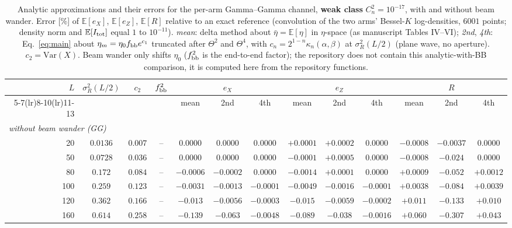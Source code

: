 \begin{table}[htbp]
\centering\scriptsize
\caption{Analytic approximations and their errors for the per-arm Gamma--Gamma channel, \textbf{weak class} $C_n^2=10^{-17}$, with and without beam wander. Error [\%] of $\mathbb E[e_X]$, $\mathbb E[e_Z]$, $\mathbb E[R]$ relative to an exact reference (convolution of the two arms' Bessel-$K$ log-densities, $6001$ points; density norm and $\mathbb E[I_{\rm tot}]$ equal $1$ to $10^{-11}$). \emph{mean}: delta method about $\bar\eta=\mathbb E[\eta]$ in $\eta$-space (as manuscript Tables IV--VI); \emph{2nd}, \emph{4th}: Eq.~\eqref{eq:main} about $\eta_m=\eta_0f_{\rm bb}e^{c_1}$ truncated after $\Theta^2$ and $\Theta^4$, with $c_n=2^{1-n}\kappa_n(\alpha,\beta)$ at $\sigma_R^2(L/2)$ (plane wave, no aperture). $c_2=\mathrm{Var}(X)$. Beam wander only shifts $\eta_0$ ($f_{\rm bb}^2$ is the end-to-end factor); the repository does not contain this analytic-with-BB comparison, it is computed here from the repository functions.}
\label{tab:perarm-weak}
\begin{tabular}{rcccccccccccc}
\toprule
$L$ & $\sigma_R^2(L/2)$ & $c_2$ & $f_{\rm bb}^2$ & \multicolumn{3}{c}{$e_X$} & \multicolumn{3}{c}{$e_Z$} & \multicolumn{3}{c}{$R$}\\
\cmidrule(lr){5-7}\cmidrule(lr){8-10}\cmidrule(lr){11-13}
 & & & & mean & 2nd & 4th & mean & 2nd & 4th & mean & 2nd & 4th\\
\midrule
\multicolumn{13}{l}{\emph{without beam wander (GG)}} \\
20 & $0.0136$ & $0.007$ & -- & $0.0000$ & $0.0000$ & $0.0000$ & $+0.0001$ & $+0.0002$ & $0.0000$ & $-0.0008$ & $-0.0037$ & $0.0000$ \\
50 & $0.0728$ & $0.036$ & -- & $0.0000$ & $0.0000$ & $0.0000$ & $-0.0001$ & $+0.0005$ & $0.0000$ & $-0.0008$ & $-0.024$ & $0.0000$ \\
80 & $0.172$ & $0.084$ & -- & $-0.0006$ & $-0.0002$ & $0.0000$ & $-0.0014$ & $+0.0001$ & $0.0000$ & $+0.0009$ & $-0.052$ & $+0.0012$ \\
100 & $0.259$ & $0.123$ & -- & $-0.0031$ & $-0.0013$ & $-0.0001$ & $-0.0049$ & $-0.0016$ & $-0.0001$ & $+0.0038$ & $-0.084$ & $+0.0039$ \\
120 & $0.362$ & $0.166$ & -- & $-0.013$ & $-0.0056$ & $-0.0003$ & $-0.015$ & $-0.0059$ & $-0.0002$ & $+0.011$ & $-0.133$ & $+0.010$ \\
160 & $0.614$ & $0.258$ & -- & $-0.139$ & $-0.063$ & $-0.0048$ & $-0.089$ & $-0.038$ & $-0.0016$ & $+0.060$ & $-0.307$ & $+0.043$ \\

\end{tabular}
\end{table}
